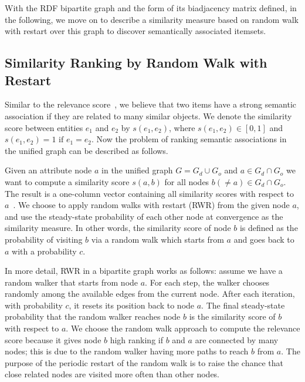 With the RDF bipartite graph and the form of its biadjacency matrix defined, in the following, we move on to describe a similarity measure based on random walk with restart over this graph to discover semantically associated itemsets.


\subsection{Similarity Ranking by Random Walk with Restart}

Similar to the relevance score~\cite{SunEtal05}, we believe that two items have a strong semantic association if they are related to many similar objects. We denote the similarity score between entities $e_1$ and $e_2$ by $s(e_1, e_2)$, where $s(e_1,e_2) \in [0, 1]$ and $s(e_1, e_2) = 1 \text{ if } e_1 = e_2$. Now the problem of ranking semantic associations in the unified graph can be described as follows.

Given an attribute node $a$ in the unified graph $G = G_d \cup G_o$ and $a \in G_d \cap G_o$ we want to compute a similarity score $s(a, b)$ for all nodes $b(\neq a) \in G_d \cap G_o$. The result is a one-column vector containing all similarity scores with respect to $a$~\cite{Chen_tuplerank:ranking}. We choose to apply random walks with restart (RWR) from the given node $a$, and use the steady-state probability of each other node at convergence as the similarity measure. In other words, the similarity score of node $b$ is defined as the probability of visiting $b$ via a random walk which starts from $a$ and goes back to $a$ with a probability $c$.


In more detail, RWR in a bipartite graph works as follows: assume we have a random walker that starts from node $a$. For each step, the walker chooses randomly among the available edges from the current node. After each iteration, with probability $c$, it resets its position back to node $a$. The final steady-state probability that the random walker reaches node $b$ is the similarity score of $b$ with respect to $a$. We choose the random walk approach to compute the relevance score because it gives node $b$ high ranking if $b$ and $a$ are connected by many nodes; this is due to the random walker having more paths to reach $b$ from $a$. The purpose of the periodic restart of the random walk is to raise the chance that close related nodes are visited more often than other nodes.


